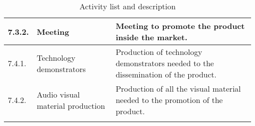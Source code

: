 \begin{longtable}[H]{l >{\raggedright\arraybackslash}p{4cm} p{8cm}}
	\midrule
	
	7.3.2. & Meeting & Meeting to promote the product inside the market.\vspace{0.2cm} \\
	
	\midrule

	7.4.1. & Technology demonstrators & Production of technology demonstrators needed to the dissemination of the product.\vspace{0.2cm} \\
	
	\midrule
	
	7.4.2. & Audio visual material production & Production of all the visual material needed to the promotion of the product.\vspace{0.2cm} \\
	
	\bottomrule[2pt]
	
	\caption{Activity list and description}
\end{longtable}